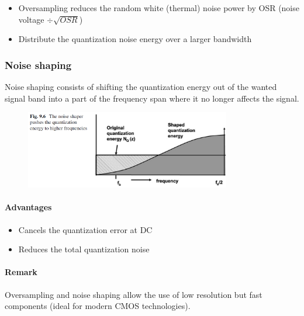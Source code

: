 \begin{itemize}
    \item Oversampling reduces the random white (thermal)
    noise power by OSR (noise voltage $\div \sqrt{OSR}$)
    \item Distribute the quantization noise energy over a
    larger bandwidth
\end{itemize}

\subsubsection{Noise shaping}

\begin{minipage}[c]{0.45 \linewidth}
Noise shaping consists of shifting the quantization energy out of the wanted signal band into
a part of the frequency span where it no longer affects the signal.
\end{minipage}\hfill
\begin{minipage}[c]{0.45 \linewidth}

\begin{figure}[H]
    \centering
    \includegraphics[width =  0.8\textwidth]{L5/img/noise-shaping.PNG}
\end{figure}

\end{minipage}


\paragraph{Advantages}
\begin{itemize}
    \item Cancels the quantization error at DC
    \item Reduces the total quantization noise
\end{itemize}

\paragraph{Remark}

Oversampling and noise shaping allow the use of low resolution but fast components (ideal for modern CMOS technologies).  

